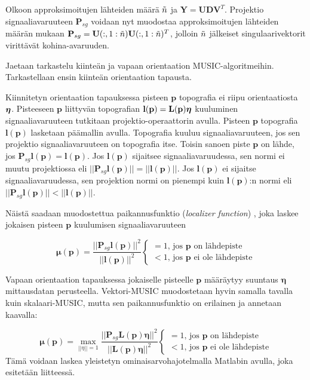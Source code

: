 Olkoon approksimoitujen lähteiden määrä $\Tilde{n}$ ja $\mathbf{Y=UDV}^T$. Projektio signaaliavaruuteen $\mathbf{P}_{sg}$ voidaan nyt muodostaa approksimoitujen lähteiden määrän mukaan $\mathbf{P}_{sg}=\mathbf{U}(:,1:\Tilde{n})\mathbf{U}(:,1:\Tilde{n})^T$, jolloin $\Tilde{n}$ jälkeiset singulaarivektorit virittävät kohina-avaruuden.

Jaetaan tarkastelu kiinteän ja vapaan orientaation MUSIC-algoritmeihin. Tarkastellaan ensin kiinteän orientaation tapausta.

Kiinnitetyn orientaation tapauksessa pisteen $\mathbf{p}$ topografia ei riipu orientaatiosta $\text{\boldmath$\eta$}$. Pisteeseen $\mathbf{p}$ liittyvän topografian $\mathbf{l(p) = L(p)\text{\boldmath$\eta$}}$ kuuluminen signaaliavaruuteen tutkitaan projektio-operaattorin avulla. Pisteen $\mathbf{p}$ topografia $\mathbf{l(p)}$ lasketaan päämallin avulla. Topografia kuuluu signaaliavaruuteen, jos sen projektio signaaliavaruuteen on topografia itse. Toisin sanoen piste $\mathbf{p}$ on lähde, jos $\mathbf{P}_{sg}\mathbf{l(p)} = \mathbf{l(p)}$. Jos $\mathbf{l(p)}$ sijaitsee signaaliavaruudessa, sen normi ei muutu projektiossa eli $||\mathbf{P}_{sg}\mathbf{l(p)}||=||\mathbf{l(p)}||$. Jos $\mathbf{l(p)}$ ei sijaitse signaaliavaruudessa, sen projektion normi on pienempi kuin $\mathbf{l(p)}$:n normi eli
$||\mathbf{P}_{sg}\mathbf{l(p)}||<||\mathbf{l(p)}||$. \citep{Makela2018TruncatedLocalization}

Näistä saadaan muodostettua paikannusfunktio (\textit{localizer function}) \citep{Makela2018TruncatedLocalization}, joka laskee jokaisen pisteen $\mathbf{p}$ kuulumisen signaaliavaruuteen

\begin{equation}
    \mathbf{\mu(p)} = \frac{||\mathbf{P}_{sg}\mathbf{l(p)}||^2}{||\mathbf{l(p)}||^2} 
    \begin{cases}
    =1\text{, jos $\mathbf{p}$ on lähdepiste}\\
    <1\text{, jos $\mathbf{p}$ ei ole lähdepiste}
     \end{cases}
\end{equation}

Vapaan orientaation tapauksessa jokaiselle pisteelle $\mathbf{p}$ määräytyy suuntaus $\mathbf{\eta}$ mittausdatan perusteella. Vektori-MUSIC muodostetaan hyvin samalla tavalla kuin skalaari-MUSIC, mutta sen paikannusfunktio on erilainen ja annetaan kaavalla:

\begin{equation}
    \mathbf{\mu(p)} = \max_{||\eta||=1} \frac{||\mathbf{P}_{sg}\mathbf{L(p)\eta}||^2}{||\mathbf{L(p)\eta}||^2}
    \begin{cases}
    =1\text{, jos $\mathbf{p}$ on lähdepiste}\\
    <1\text{, jos $\mathbf{p}$ ei ole lähdepiste}
     \end{cases}
\end{equation}
Tämä voidaan laskea yleistetyn ominaisarvohajotelmalla Matlabin avulla, joka esitetään liitteessä.

